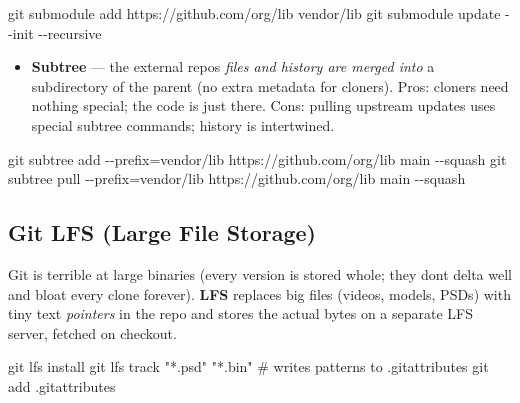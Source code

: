 \documentclass[11pt]{article}
\providecommand{\tightlist}{\setlength{\itemsep}{1pt}\setlength{\parskip}{0pt}}
\newenvironment{Shaded}{\begin{snugshade}}{\end{snugshade}}
\newcommand{\AttributeTok}[1]{\textcolor[rgb]{0.16,0.50,0.73}{#1}}
\newcommand{\CommentTok}[1]{\textcolor[rgb]{0.48,0.49,0.49}{#1}}
\newcommand{\FunctionTok}[1]{\textcolor[rgb]{0.56,0.27,0.68}{#1}}
\newcommand{\NormalTok}[1]{\textcolor[rgb]{0.81,0.81,0.76}{#1}}
\newcommand{\OperatorTok}[1]{\textcolor[rgb]{0.81,0.81,0.76}{#1}}
\newcommand{\StringTok}[1]{\textcolor[rgb]{0.96,0.31,0.31}{#1}}
\begin{document}

\begin{Shaded}
\begin{Highlighting}[]
\FunctionTok{git}\NormalTok{ submodule add https://github.com/org/lib vendor/lib}
\FunctionTok{git}\NormalTok{ submodule update }\AttributeTok{{-}{-}init} \AttributeTok{{-}{-}recursive}
\end{Highlighting}
\end{Shaded}

\begin{itemize}
\tightlist
\item
  \textbf{Subtree} --- the external repo\textquotesingle s \emph{files and history are merged into} a subdirectory of the parent (no extra metadata for cloners). Pros: cloners need nothing special; the code is just there. Cons: pulling upstream updates uses special subtree commands; history is intertwined.
\end{itemize}


\begin{Shaded}
\begin{Highlighting}[]
\FunctionTok{git}\NormalTok{ subtree add }\AttributeTok{{-}{-}prefix}\OperatorTok{=}\NormalTok{vendor/lib https://github.com/org/lib main }\AttributeTok{{-}{-}squash}
\FunctionTok{git}\NormalTok{ subtree pull }\AttributeTok{{-}{-}prefix}\OperatorTok{=}\NormalTok{vendor/lib https://github.com/org/lib main }\AttributeTok{{-}{-}squash}
\end{Highlighting}
\end{Shaded}

\subsection{Git LFS (Large File Storage)}\label{git-lfs-large-file-storage}

Git is terrible at large binaries (every version is stored whole; they don\textquotesingle t delta well and bloat every clone forever). \textbf{LFS} replaces big files (videos, models, PSDs) with tiny text \emph{pointers} in the repo and stores the actual bytes on a separate LFS server, fetched on checkout.


\begin{Shaded}
\begin{Highlighting}[]
\FunctionTok{git}\NormalTok{ lfs install}
\FunctionTok{git}\NormalTok{ lfs track }\StringTok{"*.psd"} \StringTok{"*.bin"}    \CommentTok{\# writes patterns to .gitattributes}
\FunctionTok{git}\NormalTok{ add .gitattributes}
\end{Highlighting}
\end{Shaded}
\end{document}

